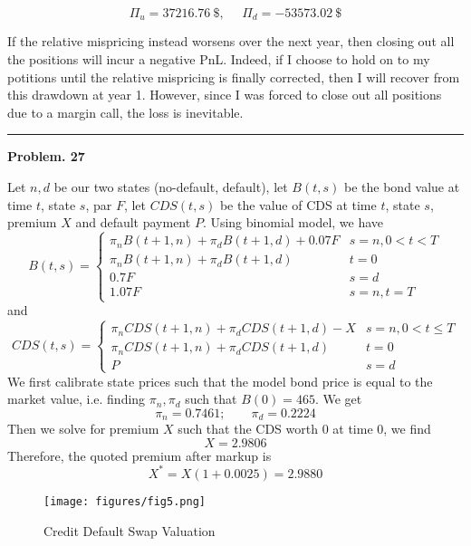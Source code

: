 \documentclass[10 pt]{hwtemplate} %
\begin{document}
\begin{solution}
\begin{itemize}
	$$
	\Pi_u = 37216.76~\$,~~~~~~\Pi_d = -53573.02~\$
	$$
\end{itemize}
If the relative mispricing instead worsens over the next year, then closing out all the positions will incur a negative PnL. Indeed, if I choose to hold on to my potitions until the relative mispricing is finally corrected, then I will recover from this drawdown at year 1. However, since I was forced to close out all positions due to a margin call, the loss is inevitable.
\end{solution}


\noindent\rule{16cm}{0.4pt}
\textbf{Problem. 27} 
\begin{solution} Let $n, d$ be our two states (no-default, default), let $B(t,s)$ be the bond value at time $t$, state $s$, par $F$, let $CDS(t,s)$ be the value of CDS at time $t$, state $s$, premium $X$ and default payment $P$. Using binomial model, we have
$$
B(t,s) = \begin{cases}
\pi_n B(t+1,n) + \pi_d B(t+1,d)+ 0.07F & s=n, 0<t<T\\
\pi_n B(t+1,n) + \pi_d B(t+1,d) & t=0\\
 0.7F & s=d\\
 1.07F & s=n, t=T
\end{cases}
$$
and
$$
CDS(t,s) = \begin{cases}
\pi_n CDS(t+1,n) + \pi_d CDS(t+1,d) - X & s = n, 0<t\leq T \\
\pi_n CDS(t+1,n) + \pi_d CDS(t+1,d)  & t=0 \\
P & s=d
\end{cases}
$$
We first calibrate state prices such that the model bond price is equal to the market value, i.e. finding $\pi_n, \pi_d$ such that $B(0) = 465$. We get
$$
\pi_n=0.7461;~~~~~ ~~~~\pi_d = 0.2224
$$
Then we solve for premium $X$ such that the CDS worth 0 at time $0$, we find
$$
X = 2.9806
$$
Therefore, the quoted premium after markup is
$$
X^* = X(1+0.0025) = 2.9880
$$
\begin{figure}[H]
  \centering
  \captionsetup{justification=centering}
  \caption{Credit Default Swap Valuation}
  \texttt{[image: figures/fig5.png]}
\end{figure}

\end{solution}
\end{document}

